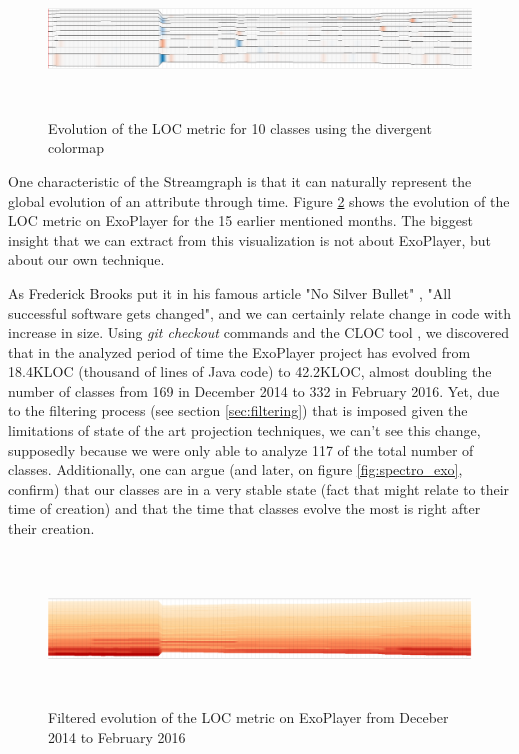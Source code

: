 \begin{figure}[H]
	\centering
	\includegraphics[width=1.0\textwidth,height=4.0cm]{figures/stream_10_loc_div.png}
	\caption{Evolution of the LOC metric for 10 classes using the divergent colormap}
	\label{fig:stream_10_loc_div}
\end{figure}

One characteristic of the Streamgraph is that it can naturally represent the global evolution of an attribute through time. Figure \ref{fig:stream_all_loc} shows the evolution of the LOC metric on ExoPlayer for the 15 earlier mentioned months. The biggest insight that we can extract from this visualization is not about ExoPlayer, but about our own technique.

As Frederick Brooks put it in his famous article "No Silver Bullet" \cite{brooks1987}, "All successful software gets changed", and we can certainly relate change in code with increase in size. Using \textit{git checkout} commands and the CLOC tool %
, we discovered that in the analyzed period of time the ExoPlayer project has evolved from 18.4KLOC (thousand of lines of Java code) to 42.2KLOC, almost doubling the number of classes from 169 in December 2014 to 332 in February 2016. Yet, due to the filtering process (see section \ref{sec:filtering}) that is imposed given the limitations of state of the art projection techniques, we can't see this change, supposedly because we were only able to analyze 117 of the total number of classes. Additionally, one can argue (and later, on figure \ref{fig:spectro_exo}, confirm) that our classes are in a very stable state (fact that might relate to their time of creation) and that the time that classes evolve the most is right after their creation.

\begin{figure}[H]
  \centering
  \includegraphics[width=1.0\textwidth,height=4.0cm]{figures/stream_all_loc.png}
  \caption{Filtered evolution of the LOC metric on ExoPlayer from Deceber 2014 to February 2016}
  \label{fig:stream_all_loc}
\end{figure}

